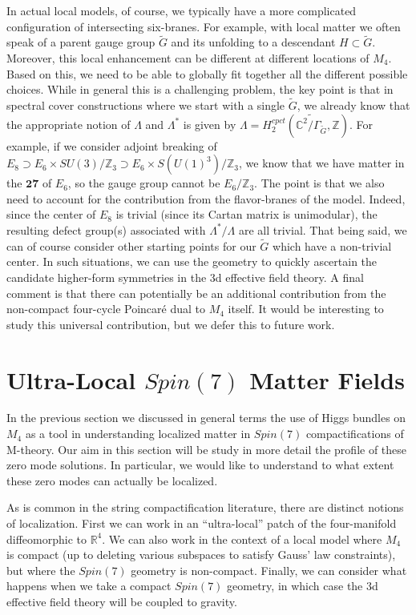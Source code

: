 \documentclass[12pt]{article}%
\numberwithin{equation}{section}
\renewcommand{\(}{\left(}
\renewcommand{\)}{\right)}
\renewcommand{\[}{\left[}
\renewcommand{\]}{\right]}
\begin{document}
In actual local models, of course, we typically have a more complicated configuration of intersecting six-branes. For example,
with local matter we often speak of a parent gauge group $\widetilde{G}$ and its unfolding to a descendant $H \subset \widetilde{G}$.
Moreover, this local enhancement can be different at different locations of $M_4$. Based on this, we need to be able to globally fit together all the different possible choices. While in general this is a challenging problem, the key point is that in spectral cover constructions
where we start with a single $\widetilde{G}$, we already know that the appropriate notion of $\Lambda$ and $\Lambda^{\ast}$
is given by $\Lambda = H_{2}^{cpct}(\widetilde{\mathbb{C}^{2}/\Gamma_{\widetilde{G}}},\mathbb{Z})$. For example,
if we consider adjoint breaking of $E_8 \supset E_6 \times SU(3) / \mathbb{Z}_3 \supset E_6 \times S(U(1)^3) / \mathbb{Z}_3 $,
we know that we have matter in the $\mathbf{27}$ of $E_6$, so the gauge group cannot be $E_6 / \mathbb{Z}_3$.
The point is that we also need to account for the contribution from the flavor-branes of the model. Indeed, since the center of $E_8$ is trivial (since its Cartan matrix is unimodular), the resulting defect group(s) associated with $\Lambda^{\ast} / \Lambda$ are all trivial. That being said, we can of course consider other starting points for our $\widetilde{G}$ which have a non-trivial center. In such situations, we can use the geometry to quickly ascertain the candidate higher-form symmetries in the 3d effective field theory. A final comment is that there can potentially be an additional contribution from the non-compact four-cycle Poincar\'{e} dual to $M_4$ itself. It would be interesting to study this universal contribution, but we defer this to future work.

\section{Ultra-Local $Spin(7)$ Matter Fields\label{sec:NOLOCO}}

In the previous section we discussed in general terms the use of Higgs bundles on $M_4$ as a tool in understanding localized matter in $Spin(7)$ compactifications of M-theory. Our aim in this section will be study in more detail the profile of these zero mode solutions. In particular, we would like to understand to what extent these zero modes can actually be localized.

As is common in the string compactification literature, there are distinct notions of localization. First we can work in an ``ultra-local'' patch of the four-manifold diffeomorphic to $\mathbb{R}^4$. We can also work in the context of a local model where $M_4$ is compact (up to deleting various subspaces to satisfy Gauss' law constraints), but where the $Spin(7)$ geometry is non-compact. Finally, we can consider what happens when we take a compact $Spin(7)$ geometry, in which case the 3d effective field theory will be coupled to gravity.
\end{document}
